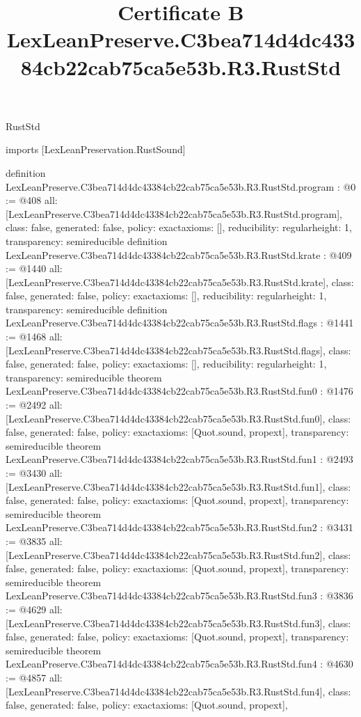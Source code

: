 \begin{lexlean}{RustStd}
\title{Certificate B LexLeanPreserve.C3bea714d4dc43384cb22cab75ca5e53b.R3.RustStd}
\begin{coremodule}
imports [LexLeanPreservation.RustSound]

definition LexLeanPreserve.C3bea714d4dc43384cb22cab75ca5e53b.R3.RustStd.program : @0 := @408 {
  all: [LexLeanPreserve.C3bea714d4dc43384cb22cab75ca5e53b.R3.RustStd.program],
  class: false,
  generated: false,
  policy: exact{axioms: []},
  reducibility: regular{height: 1},
  transparency: semireducible
}
definition LexLeanPreserve.C3bea714d4dc43384cb22cab75ca5e53b.R3.RustStd.krate : @409 := @1440 {
  all: [LexLeanPreserve.C3bea714d4dc43384cb22cab75ca5e53b.R3.RustStd.krate],
  class: false,
  generated: false,
  policy: exact{axioms: []},
  reducibility: regular{height: 1},
  transparency: semireducible
}
definition LexLeanPreserve.C3bea714d4dc43384cb22cab75ca5e53b.R3.RustStd.flags : @1441 := @1468 {
  all: [LexLeanPreserve.C3bea714d4dc43384cb22cab75ca5e53b.R3.RustStd.flags],
  class: false,
  generated: false,
  policy: exact{axioms: []},
  reducibility: regular{height: 1},
  transparency: semireducible
}
theorem LexLeanPreserve.C3bea714d4dc43384cb22cab75ca5e53b.R3.RustStd.fun0 : @1476 := @2492 {
  all: [LexLeanPreserve.C3bea714d4dc43384cb22cab75ca5e53b.R3.RustStd.fun0],
  class: false,
  generated: false,
  policy: exact{axioms: [Quot.sound, propext]},
  transparency: semireducible
}
theorem LexLeanPreserve.C3bea714d4dc43384cb22cab75ca5e53b.R3.RustStd.fun1 : @2493 := @3430 {
  all: [LexLeanPreserve.C3bea714d4dc43384cb22cab75ca5e53b.R3.RustStd.fun1],
  class: false,
  generated: false,
  policy: exact{axioms: [Quot.sound, propext]},
  transparency: semireducible
}
theorem LexLeanPreserve.C3bea714d4dc43384cb22cab75ca5e53b.R3.RustStd.fun2 : @3431 := @3835 {
  all: [LexLeanPreserve.C3bea714d4dc43384cb22cab75ca5e53b.R3.RustStd.fun2],
  class: false,
  generated: false,
  policy: exact{axioms: [Quot.sound, propext]},
  transparency: semireducible
}
theorem LexLeanPreserve.C3bea714d4dc43384cb22cab75ca5e53b.R3.RustStd.fun3 : @3836 := @4629 {
  all: [LexLeanPreserve.C3bea714d4dc43384cb22cab75ca5e53b.R3.RustStd.fun3],
  class: false,
  generated: false,
  policy: exact{axioms: [Quot.sound, propext]},
  transparency: semireducible
}
theorem LexLeanPreserve.C3bea714d4dc43384cb22cab75ca5e53b.R3.RustStd.fun4 : @4630 := @4857 {
  all: [LexLeanPreserve.C3bea714d4dc43384cb22cab75ca5e53b.R3.RustStd.fun4],
  class: false,
  generated: false,
  policy: exact{axioms: [Quot.sound, propext]},
}
\end{coremodule}
\end{lexlean}
